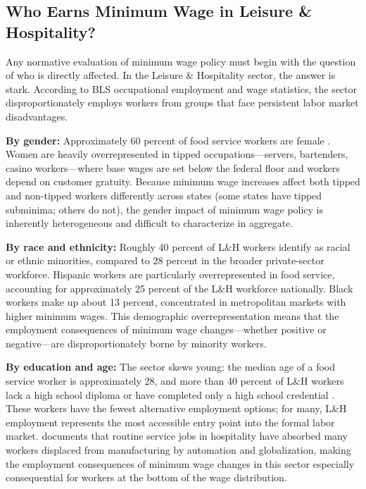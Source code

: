 \documentclass[12pt]{article}
\begin{document}
\subsection{Who Earns Minimum Wage in Leisure \& Hospitality?}

Any normative evaluation of minimum wage policy must begin with the question
of who is directly affected.  In the Leisure \& Hospitality sector, the answer
is stark.  According to BLS occupational employment and wage statistics, the
sector disproportionately employs workers from groups that face persistent
labor market disadvantages.

\textbf{By gender:} Approximately 60 percent of food service workers are
female \citep{bls2023characteristics}.  Women are heavily overrepresented in
tipped occupations---servers, bartenders, casino workers---where base wages are
set below the federal floor and workers depend on customer gratuity.  Because
minimum wage increases affect both tipped and non-tipped workers differently
across states (some states have tipped subminima; others do not), the gender
impact of minimum wage policy is inherently heterogeneous and difficult to
characterize in aggregate.

\textbf{By race and ethnicity:} Roughly 40 percent of L\&H workers identify as
racial or ethnic minorities, compared to 28 percent in the broader private-sector
workforce.  Hispanic workers are particularly overrepresented in food service,
accounting for approximately 25 percent of the L\&H workforce nationally.
Black workers make up about 13 percent, concentrated in metropolitan markets
with higher minimum wages.  This demographic overrepresentation means that
the employment consequences of minimum wage changes---whether positive or
negative---are disproportionately borne by minority workers.

\textbf{By education and age:} The sector skews young: the median age of a food
service worker is approximately 28, and more than 40 percent of L\&H workers
lack a high school diploma or have completed only a high school credential
\citep{bls2023characteristics}.  These workers have the fewest alternative
employment options; for many, L\&H employment represents the most accessible
entry point into the formal labor market.  \citet{autor2016workforce} documents
that routine service jobs in hospitality have absorbed many workers displaced
from manufacturing by automation and globalization, making the employment
consequences of minimum wage changes in this sector especially consequential
for workers at the bottom of the wage distribution.
\end{document}
